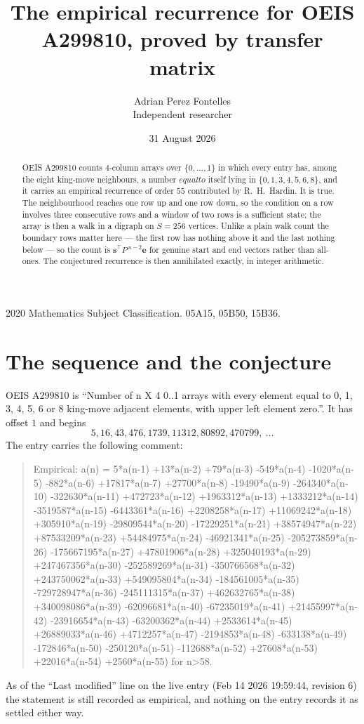 \documentclass[11pt,a4paper]{article}
\title{The empirical recurrence for OEIS A299810, proved by transfer matrix}
\author{Adrian Perez Fontelles\\ \small Independent researcher}
\date{31 August 2026}
\theoremstyle{plain}
\theoremstyle{definition}
\begin{document}
\maketitle

\begin{abstract}
OEIS A299810 counts $4$-column arrays over $\{0,\dots,1\}$ in which every entry has,
among the eight king-move neighbours, a number $equal to$ itself lying in $\{0,1,3,4,5,6,8\}$, and it carries an empirical
recurrence of order $55$ contributed by R.~H.~Hardin. It is true. The neighbourhood
reaches one row up and one row down, so the condition on a row involves three consecutive
rows and a window of two rows is a sufficient state; the array is then a walk in a digraph
on $S=256$ vertices. Unlike a plain walk count the boundary rows matter here --- the first
row has nothing above it and the last nothing below --- so the count is
$\mathbf{s}^{\!\top}P^{\,n-2}\mathbf{e}$ for genuine start and end vectors rather than
all-ones. The conjectured recurrence is then annihilated exactly, in integer arithmetic.
\end{abstract}

\noindent\small 2020 Mathematics Subject Classification. 05A15, 05B50, 15B36.\normalsize

\section{The sequence and the conjecture}

OEIS A299810 is ``Number of n X 4 0..1 arrays with every element equal to 0, 1, 3, 4, 5, 6 or 8 king-move adjacent elements, with upper left element zero.''. It has offset
$1$ and begins
\[
5, 16, 43, 476, 1739, 11312, 80892, 470799,\ \dots
\]
The entry carries the following comment:
\begin{quote}\small
Empirical: a(n) = 5*a(n-1) +13*a(n-2) +79*a(n-3) -549*a(n-4) -1020*a(n-5) -882*a(n-6) +17817*a(n-7) +27700*a(n-8) -19490*a(n-9) -264340*a(n-10) -322630*a(n-11) +472723*a(n-12) +1963312*a(n-13) +1333212*a(n-14) -3519587*a(n-15) -6443361*a(n-16) +2208258*a(n-17) +11069242*a(n-18) +305910*a(n-19) -29809544*a(n-20) -17229251*a(n-21) +38574947*a(n-22) +87533209*a(n-23) +54484975*a(n-24) -46921341*a(n-25) -205273859*a(n-26) -175667195*a(n-27) +47801906*a(n-28) +325040193*a(n-29) +247467356*a(n-30) -252589269*a(n-31) -350766568*a(n-32) +243750062*a(n-33) +549095804*a(n-34) -184561005*a(n-35) -729728947*a(n-36) -245111315*a(n-37) +462632765*a(n-38) +340098086*a(n-39) -62096681*a(n-40) -67235019*a(n-41) +21455997*a(n-42) -23916654*a(n-43) -63200362*a(n-44) +2533614*a(n-45) +26889033*a(n-46) +4712257*a(n-47) -2194853*a(n-48) -633138*a(n-49) -172846*a(n-50) -250120*a(n-51) -112688*a(n-52) +27608*a(n-53) +22016*a(n-54) +2560*a(n-55) for n>58.
\end{quote}
As of the ``Last modified'' line on the live entry (Feb 14 2026 19:59:44, revision
6) the statement is still recorded as empirical, and nothing on the entry
records it as settled either way.
\end{document}

